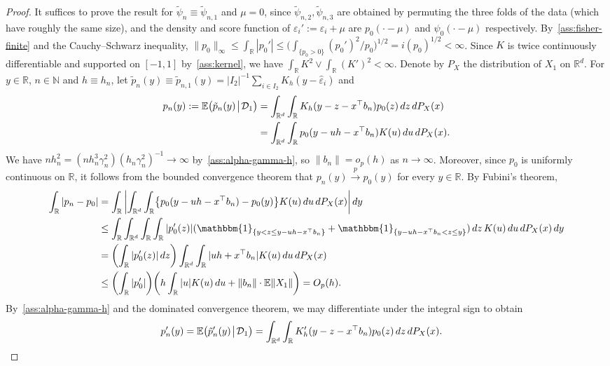 \documentclass[a4paper]{article}
\newcommand{\N}{\mathbb{N}}
\newcommand{\R}{\mathbb{R}}
\newcommand{\E}{\mathbb{E}}
\newcommand{\Ind}{\mathbbm{1}}
\newcommand{\norm}[1]{\|{#1}\|}
\newcommand{\cvp}{\overset{p}{\to}}
\theoremstyle{definition}
\begin{document}
\begin{proof}
It suffices to prove the result for $\tilde{\psi}_n \equiv \tilde{\psi}_{n,1}$ and $\mu = 0$, since $\tilde{\psi}_{n,2},\tilde{\psi}_{n,3}$ are obtained by permuting the three folds of the data (which have roughly the same size), and the density and score function of $\varepsilon_i' := \varepsilon_i + \mu$ are $p_0(\cdot - \mu)$ and $\psi_0(\cdot - \mu)$ respectively. By~\ref{ass:fisher-finite} and the Cauchy--Schwarz inequality, $\norm{p_0}_\infty \leq \int_\R |p_0'| \leq \bigl(\int_{\{p_0 > 0\}} (p_0')^2/p_0\bigr)^{1/2} = i(p_0)^{1/2} < \infty$. Since $K$ is twice continuously differentiable and supported on $[-1,1]$ by~\ref{ass:kernel}, we have $\int_\R K^2 \vee \int_\R (K')^2 < \infty$. Denote by $P_X$ the distribution of $X_1$ on $\R^d$. For $y \in \R$, $n \in \N$ and $h \equiv h_n$, let $\tilde{p}_n(y) \equiv \tilde{p}_{n,1}(y) = |I_2|^{-1}\sum_{i \in I_2}K_h(y - \hat{\varepsilon}_i)$ and
\begin{align*}
p_n(y) := \E\bigl(\tilde{p}_n(y) \!\bigm|\! \mathcal{D}_1\bigr) &= \int_{\R^d} \int_\R K_h(y - z - x^\top b_n)p_0(z)\,dz\,dP_X(x) \notag \\
&= \int_{\R^d} \int_\R p_0(y - uh - x^\top b_n)K(u)\,du\,dP_X(x).
\end{align*}
We have $nh_n^2 = (nh_n^3\gamma_n^2)(h_n\gamma_n^2)^{-1} \to \infty$ by~\ref{ass:alpha-gamma-h}, so $\norm{b_n} = o_p(h)$ as $n \to \infty$. Moreover, since $p_0$ is uniformly continuous on $\R$, it follows from the bounded convergence theorem that $p_n(y) \cvp p_0(y)$ for every $y \in \R$. By Fubini's theorem,
\begin{align}
\int_\R |p_n - p_0|
&= \int_\R\,\biggl|\int_{\R^d} \int_\R \bigl\{p_0(y - uh - x^\top b_n) - p_0(y)\bigr\}K(u)\,du\,dP_X(x)\biggr|\,dy \notag \\
&\leq \int_\R \int_{\R^d} \int_\R \int_\R |p_0'(z)|(\Ind_{\{y < z \leq y - uh - x^\top b_n\}} + \Ind_{\{y - uh - x^\top b_n < z \leq y\}})\,dz\,K(u)\,du\,dP_X(x)\,dy \notag \\
&= \biggl(\int_\R |p_0'(z)|\,dz\biggr) \int_{\R^d} \int_\R |uh + x^\top b_n|K(u)\,du\,dP_X(x) \notag \\
\label{eq:kernel-L1-bias}
&\leq \biggl(\int_\R |p_0'|\biggr)\biggl(h\int_\R |u|K(u)\,du + \norm{b_n} \cdot \E\norm{X_1}\biggr) = O_p(h).
\end{align}
By~\ref{ass:alpha-gamma-h} and the dominated convergence theorem, we may differentiate under the integral sign to obtain
\begin{align*}
p_n'(y) = \E\bigl(\tilde{p}_n'(y) \!\bigm|\! \mathcal{D}_1\bigr) &= \int_{\R^d} \int_\R K_h'(y - z - x^\top b_n)p_0(z)\,dz\,dP_X(x).

\end{align*}
\end{proof}
\end{document}
